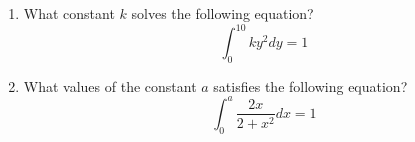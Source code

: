 \documentclass[11pt]{article}
\begin{document}
\begin{enumerate}
\pagebreak

\item What constant $k$ solves the following equation?
$$\int_0^{10} ky^2dy=1$$
\bigskip
\bigskip
\bigskip
\bigskip\bigskip
\bigskip
\bigskip
\bigskip\bigskip
\bigskip
\bigskip
\bigskip\bigskip
\bigskip
\bigskip
\bigskip
\item What values of the constant $a$ satisfies the following equation?
$$\int_0^a \frac{2x}{2+x^2}dx=1$$


\end{enumerate}
\end{document}
